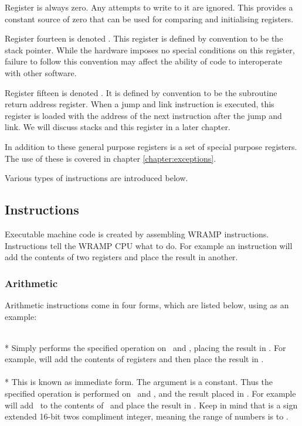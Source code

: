 Register  is always zero. Any attempts to write to it are
ignored. This provides a constant source of zero that can be used for
comparing and initialising registers.

Register fourteen is denoted . This register is defined by
convention to be the stack pointer. While the hardware imposes no
special conditions on this register, failure to follow this convention
may affect the ability of code to interoperate with other software.

Register fifteen is denoted . It is defined by convention to
be the subroutine return address register. When a jump and link
instruction is executed, this register is loaded with the address of
the next instruction after the jump and link. We will discuss stacks
and this register in a later chapter.

In addition to these general purpose registers is a set of special
purpose registers. The use of these is covered in chapter
\ref{chapter:exceptions}.

Various types of instructions are introduced below.

\subsection{Instructions}

Executable machine code is created by assembling WRAMP instructions.
Instructions tell the WRAMP CPU what to do. For example an 
instruction will add the contents of two registers and place the result
in another.

\subsubsection{Arithmetic}
Arithmetic instructions come in four forms, which are listed
below, using  as an example:


 \\*
Simply performs the specified operation
on \regs\ and \regt, placing the result in \regd. For example,
\mbox{} will add the contents of registers
 and  then place the result in .
\\

 \\*
This is known as immediate form.
The argument  is a constant. Thus the specified
operation is performed on \regs\ and , and the result
placed in \regd. For example \mbox{} will add
\ to the contents of \ and place the result in .
Keep in mind that  is a sign extended 16-bit twos compliment integer,
meaning the range of numbers is  to .
\\

